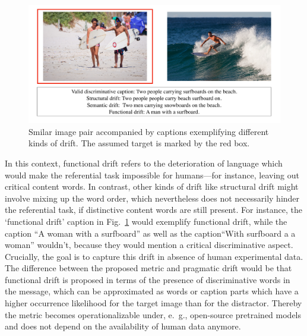 \begin{figure}[h]
	\centering
	\includegraphics[width=0.9\linewidth]{images/COCO_drift_example_cropped.pdf}
	\caption{Smilar image pair accompanied by captions exemplifying different kinds of drift. The assumed target is marked by the red box.}
	\label{fig:coco_drift_example}
\end{figure}

In this context, functional drift refers to the deterioration of language which would make the referential task impossible for humans---for instance, leaving out critical content words. 
In contrast, other kinds of drift like structural drift might involve mixing up the word order, which nevertheless does not necessarily hinder the referential task, if distinctive content words are still present. For instance, the `functional drift' caption in Fig.~\ref{fig:coco_drift_example} would exemplify functional drift, while the caption ``A woman with a surfboard'' as well as the caption``With surfboard a a woman'' wouldn't, because they would mention a critical discriminative aspect. 
Crucially, the goal is to capture this drift in absence of human experimental data. The difference between the proposed metric and pragmatic drift would be that functional drift is proposed in terms of the presence of discriminative words in the message, which can be approximated as words or caption parts which have a higher occurrence likelihood for the target image than for the distractor. Thereby the metric becomes operationalizable under, e.~g., open-source pretrained models and does not depend on the availability of human data anymore. 


